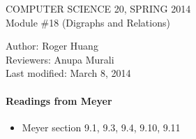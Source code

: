 \documentclass[12pt]{article}
\begin{document}
\textsl{}

\begin{center}
COMPUTER SCIENCE 20, SPRING 2014 \\

Module \#18 (Digraphs and Relations)
\end{center}
Author: Roger Huang\\
Reviewers: Anupa Murali\\
Last modified: March 8, 2014
\paragraph*{Readings from Meyer}
\begin{itemize}
\item Meyer section 9.1, 9.3, 9.4, 9.10, 9.11
\end{itemize}
\end{document}
